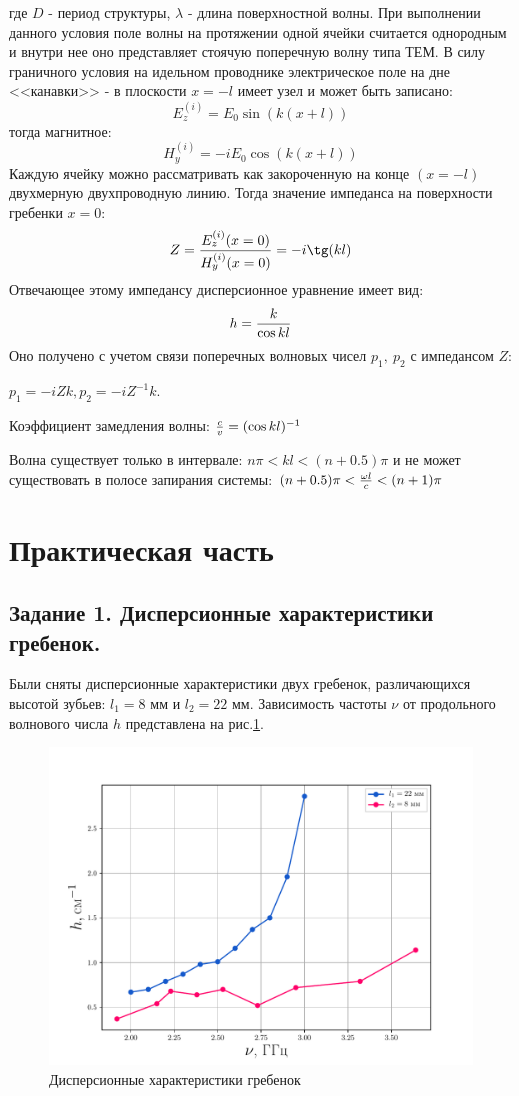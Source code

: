 где $D$ - период структуры, $\lambda$ - длина поверхностной волны. При выполнении данного условия поле волны на протяжении одной ячейки считается однородным и внутри нее оно представляет стоячую поперечную волну типа ТЕМ. В силу граничного условия на идельном проводнике электрическое поле на дне <<канавки>> - в плоскости $x=-l$ имеет узел и может быть записано:
\begin{equation}
    E_z^{(i)}=E_0\sin(k(x+l))
\end{equation}
тогда магнитное:
\begin{equation}
    H_y^{(i)}=-iE_0\cos(k(x+l))
\end{equation}
Каждую ячейку можно рассматривать как закороченную на конце $(x=-l)$ двухмерную двухпроводную линию. Тогда значение импеданса на поверхности гребенки $x=0$:
$$Z={{E_z^{(i)}(x=0)}\over{H_y^{(i)}(x=0)}}=-i\tg(kl)$$
Отвечающее этому импедансу дисперсионное уравнение имеет вид:
$$h={{k}\over{\cos kl}}$$
Оно получено с учетом связи поперечных волновых чисел $p_1,~ p_2$ с импедансом $Z$:

 $p_1 = -iZk, p_2 = -iZ^{-1}k$.


Коэффициент замедления волны: ${{c}\over{v}}=(\cos kl)^{-1}$


Волна существует только в интервале: $n\pi <kl<(n+0.5)\pi$
и не может существовать в полосе запирания системы: $(n+0.5)\pi <{{\omega l}\over{c}}<(n+1)\pi$




\section{Практическая часть} %
\subsection*{Задание 1. Дисперсионные характеристики гребенок.} %
Были сняты дисперсионные характеристики двух гребенок, различающихся высотой зубьев: $l_1 = 8$ мм и $l_2 = 22 $ мм.
Зависимость частоты  $\nu$ от продольного волнового числа  $h$ представлена на рис.\ref{fig:1}.
\begin{figure}[h!]
\centering
\includegraphics[width=0.9\linewidth]{rec/task1.pdf}
\caption{Дисперсионные характеристики гребенок}
\label{fig:1}
\end{figure}

